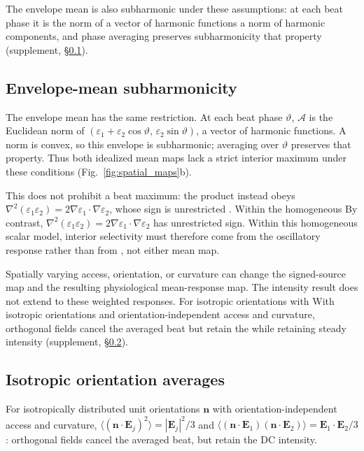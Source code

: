 \documentclass[11pt,a4paper]{article}
\newif\ifjne
\providecommand{\DIFaddtex}[1]{{\protect\color{blue} \sf #1}} %
\providecommand{\DIFdeltex}[1]{{\protect\color{red} \scriptsize #1}} %
\providecommand{\DIFaddbegin}{} %
\providecommand{\DIFaddend}{} %
\providecommand{\DIFdelbegin}{} %
\providecommand{\DIFdelend}{} %
\providecommand{\DIFadd}[1]{\texorpdfstring{\DIFaddtex{#1}}{#1}} %
\providecommand{\DIFdel}[1]{\texorpdfstring{\DIFdeltex{#1}}{}} %
\begin{document}
The envelope mean is also subharmonic\DIFdelbegin \DIFdel{under these assumptions}\DIFdelend : at each beat phase it is \DIFdelbegin \DIFdel{the norm of
a vector of harmonic functions}\DIFdelend \DIFaddbegin \DIFadd{a norm of
harmonic components}\DIFaddend , and phase averaging preserves \DIFdelbegin \DIFdel{subharmonicity }\DIFdelend \DIFaddbegin \DIFadd{that property }\DIFaddend (supplement,
\S\ref{supp:envelope-proof}).
\ifjne\else
\subsection{Envelope-mean subharmonicity}\label{supp:envelope-proof}
The envelope mean has the same restriction. At each beat phase $\vartheta$,
$\mathcal A$ is the Euclidean norm of
$(\varepsilon_1+\varepsilon_2\cos\vartheta,\,\varepsilon_2\sin\vartheta)$,
a vector of harmonic functions. A norm is convex, so this envelope is subharmonic;
averaging over $\vartheta$ preserves that property. Thus both idealized mean maps
lack a strict interior maximum under these conditions (Fig.~\ref{fig:spatial_maps}b).

\fi
\DIFdelbegin \DIFdel{This does not prohibit a beat maximum: the product instead obeys
$\nabla^2(\varepsilon_1\varepsilon_2)=2\nabla\varepsilon_1\cdot\nabla\varepsilon_2$,
whose sign is unrestricted . Within the homogeneous }\DIFdelend \DIFaddbegin \DIFadd{By contrast,
$\nabla^2(\varepsilon_1\varepsilon_2)=2\nabla\varepsilon_1\cdot\nabla\varepsilon_2$
has unrestricted sign. Within this homogeneous scalar }\DIFaddend model, interior
selectivity must \DIFdelbegin \DIFdel{therefore }\DIFdelend come from the oscillatory response\DIFdelbegin \DIFdel{rather than from }\DIFdelend \DIFaddbegin \DIFadd{, not }\DIFaddend either mean map.
\DIFdelbegin %

\DIFdel{Spatially varying access, orientation, or curvature can change the signed-source
map and the resulting physiological mean-response map. The intensity result does
not extend to these weighted responses. For isotropic orientations with }\DIFdelend \DIFaddbegin \DIFadd{With isotropic orientations and }\DIFaddend orientation-independent access and curvature,
orthogonal fields cancel the averaged beat \DIFdelbegin \DIFdel{but retain the }\DIFdelend \DIFaddbegin \DIFadd{while retaining }\DIFaddend steady intensity
(supplement, \S\ref{supp:orientation}).
\ifjne\else
\subsection{Isotropic orientation averages}\label{supp:orientation}
For isotropically distributed unit orientations
$\mathbf n$ with orientation-independent access and curvature,
$\langle(\mathbf n\cdot\mathbf E_j)^2\rangle=|\mathbf E_j|^2/3$
and $\langle(\mathbf n\cdot\mathbf E_1)(\mathbf n\cdot\mathbf E_2)\rangle
=\mathbf E_1\cdot\mathbf E_2/3$: orthogonal fields cancel the averaged beat,
but retain the DC intensity.
\end{document}
